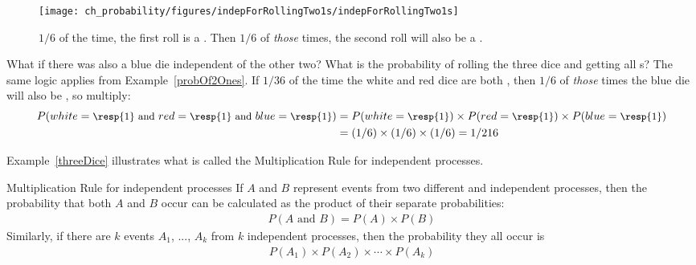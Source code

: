\begin{figure}[hht]
\centering
\texttt{[image: ch\_probability/figures/indepForRollingTwo1s/indepForRollingTwo1s]}
\caption{$1/6$ of the time, the first roll is a . Then $1/6$ of \emph{those} times, the second roll will also be a .}
\label{indepForRollingTwo1s}
\end{figure}

\begin{examplewrap}
\begin{nexample}{What if there was also a blue die independent of the other two? What is the probability of rolling the three dice and getting all s?}\label{threeDice}
The same logic applies from Example~\ref{probOf2Ones}. If $1/36$ of the time the white and red dice are both , then $1/6$ of \emph{those} times the blue die will also be , so multiply:
{\begin{align*}
P(white=\text{\small\resp{1} and } red=\text{\small\resp{1} and } blue=\text{\small\resp{1}})
	&= P(white=\text{\small\resp{1}})\times P(red=\text{\small\resp{1}})\times P(blue=\text{\small\resp{1}}) \\
	&= (1/6)\times (1/6)\times (1/6)
	= 1/216
\end{align*}} \vspace{-7mm}
\end{nexample}
\end{examplewrap}

Example~\ref{threeDice} illustrates what is called the Multiplication Rule for independent processes. 

\begin{onebox}{Multiplication Rule for independent processes}
  If $A$ and $B$ represent events from two different and
  independent processes, then the probability that both $A$
  and $B$ occur can be calculated as the product of their
  separate probabilities:
  \begin{align*}
  P(A \text{ and }B) = P(A) \times  P(B)
  \end{align*}
  Similarly, if there are $k$ events $A_1$, ..., $A_k$
  from $k$ independent processes, then the probability
  they all occur is
  \begin{align*}
  P(A_1) \times  P(A_2)\times  \cdots \times  P(A_k)
  \end{align*}\vspace{-6mm}
\end{onebox}

